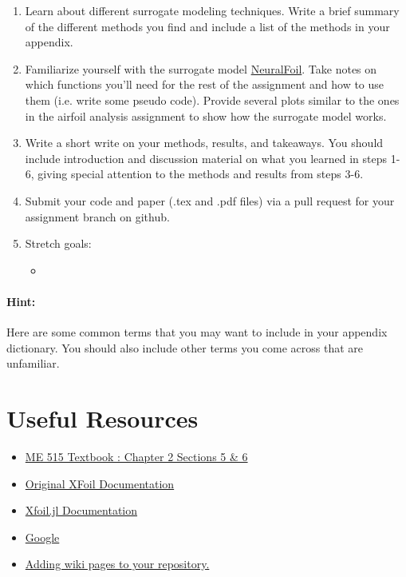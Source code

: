 \documentclass[12pt]{article}
\begin{document}
\begin{enumerate}
	\item Learn about different surrogate modeling techniques. Write a brief summary of the different methods you find and include a list of the methods in your appendix.
	\item Familiarize yourself with the surrogate model \href{https://github.com/peterdsharpe/NeuralFoil}{NeuralFoil}. Take notes on which functions you'll need for the rest of the assignment and how to use them (i.e. write some pseudo code). Provide several plots similar to the ones in the airfoil analysis assignment to show how the surrogate model works.
	\item Write a short write on your methods, results, and takeaways. You should include introduction and discussion material on what you learned in steps 1-6, giving special attention to the methods and results from steps 3-6. 
	\item Submit your code and paper (.tex and .pdf files) via a pull request for your assignment branch on github.
	\item Stretch goals:
	\begin{itemize}
		\item 
	\end{itemize}
\end{enumerate}

\bigskip

\paragraph{Hint:} Here are some common terms that you may want to include in your appendix dictionary. You should also include other terms you come across that are unfamiliar.




\section{Useful Resources}

\begin{itemize}
 	\item \href{https://byu.box.com/shared/static/ywfayozbj3sr2ot6b32u8nqk5brqvurt.pdf}{ME 515 Textbook : Chapter 2 Sections 5 \& 6}
 	\item \href{http://web.mit.edu/drela/Public/web/xfoil/xfoil_doc.txt}{Original XFoil Documentation}
  	\item \href{https://flow.byu.edu/Xfoil.jl/stable/}{Xfoil.jl Documentation}
 	\item \href{https://www.google.com/}{Google}
	\item \href{https://docs.github.com/en/communities/documenting-your-project-with-wikis/adding-or-editing-wiki-pages}{Adding wiki pages to your repository.}
\end{itemize}
\end{document}
